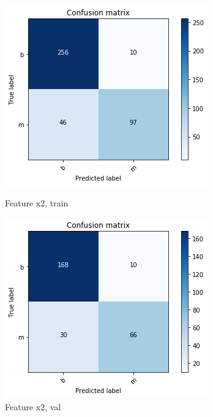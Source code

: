 \documentclass[11pt,a4paper]{article}
\begin{document}
\begin{enumerate}
\begin{enumerate}
		\begin{figure}[H]\centering
				\begin{minipage}{0.49\textwidth}
					\includegraphics[width=\linewidth]{figures/conf_train_x2.png}
					\caption{Feature x2, train}\label{fig:conf_train_x2.png}
				\end{minipage}
				\begin{minipage}{0.49\textwidth}
 				\includegraphics[width=\linewidth]{figures/conf_val_x2.png}
				\caption{Feature x2, val}\label{fig:conf_val_x2.png}
			\end{minipage}
		\end{figure}


\end{enumerate}
\end{enumerate}
\end{document}
